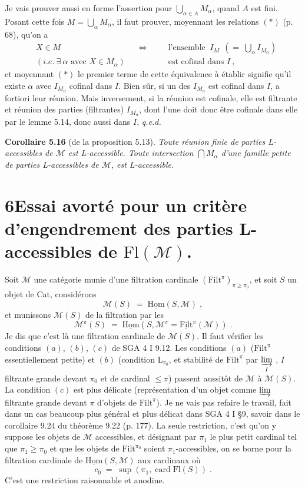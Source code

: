 \documentclass[11pt]{article}
\newcommand{\printedpage}[1]{\marginpar{\raggedright\footnotesize p.~#1}}
\newcommand{\msp}[1]{\marginpar{\raggedright\footnotesize [#1]}}
\newcommand{\Filt}{\mathrm{Filt}}
\newcommand{\Fl}{\mathrm{Fl}}
\newcommand{\card}{\operatorname{card}}
\newcommand{\uHom}{\underline{\mathrm{Hom}}}
\begin{document}
Je vais prouver aussi en forme l'assertion pour $\bigcup_{\alpha\in A} M_{\alpha}$, quand $A$ est fini. Posant cette fois $M = \bigcup_{\alpha} M_{\alpha}$, il faut prouver, moyennant les relations $(*)$ (p. 68), qu'on a
\[
\begin{aligned}
&X \in M &&\Longleftrightarrow \quad &&\text{l'ensemble } \ I_{M} \ \ (= \ \textstyle\bigcup_{\alpha} I_{M_{\alpha}})\\
&(\textit{i.e.} \ \exists \ \alpha \text{ avec } X \in M_{\alpha}) && &&\text{est cofinal dans } I \ ,
\end{aligned}
\tag*{$(**)$}
\]
et moyennant $(*)$ le premier terme de cette équivalence à établir signifie qu'il existe $\alpha$ avec $I_{M_{\alpha}}$ cofinal dans $I$. Bien sûr, si un des $I_{M_{\alpha}}$ est cofinal dans $I$, a fortiori leur réunion. Mais inversement, si la réunion est cofinale, elle est filtrante et réunion des parties (filtrantes) $I_{M_{\alpha}}$, dont l'une doit donc être cofinale dans elle par le lemme 5.14, donc aussi dans $I$, \textit{q.e.d.}

\msp{page 73}
\textbf{Corollaire 5.16} (de la proposition 5.13). \textit{Toute réunion finie de parties L-accessibles de $\mathcal{M}$ est L-accessible. Toute intersection $\bigcap M_{\alpha}$ d'une famille petite de parties L-accessibles de $\mathcal{M}$, est L-accessible.}

\printedpage{41}

\section*{6\quad Essai avorté pour un critère d'engendrement des parties L-accessibles de $\Fl(\mathcal{M})$.}

Soit $\mathcal{M}$ une catégorie munie d'une filtration cardinale $(\Filt^{\pi})_{\pi\geq\pi_{0}}$, et soit $S$ un objet de Cat, considérons
\[
\mathcal{M}(S) \;=\; \uHom(S,\mathcal{M}) \; ,
\]
et munissons $\mathcal{M}(S)$ de la filtration par les
\[
\mathcal{M}^{\pi}(S) \;=\; \uHom(S,\mathcal{M}^{\pi} = \underline{\Filt}^{\pi}(\mathcal{M})) \; .
\]
Je dis que c'est là une filtration cardinale de $\mathcal{M}(S)$. Il faut vérifier les conditions $(a)$, $(b)$, $(c)$ de SGA 4 I 9.12. Les conditions $(a)$ ($\Filt^{\pi}$ essentiellement petite) et $(b)$ (condition $\mathrm{L}_{\pi_{0}}$, et stabilité de $\Filt^{\pi}$ par $\varinjlim\limits_{I}$ , $I$ filtrante grande devant $\pi_{0}$ et de cardinal $\leq \pi$) passent aussitôt de $\mathcal{M}$ à $\mathcal{M}(S)$. La condition $(c)$ est plus délicate (représentation
\msp{page 74}
d'un objet comme $\varinjlim$ filtrante grande devant $\pi$ d'objets de $\Filt^{\pi}$). Je ne vais pas refaire le travail, fait dans un cas beaucoup plus général et plus délicat dans SGA 4 I §9, savoir dans le corollaire 9.24 du théorème 9.22 (p. 177). La seule restriction, c'est qu'on y suppose les objets de $\mathcal{M}$ accessibles, et désignant par $\pi_{1}$ le plus petit cardinal tel que $\pi_{1} \geq \pi_{0}$ et que les objets de $\Filt^{\pi_{0}}$ soient $\pi_{1}$-accessibles, on se borne pour la filtration cardinale de $\uHom(S,\mathcal{M})$ aux cardinaux  où
\[
c_{0} \;=\; \sup(\pi_{1}, \card \Fl(S)) \; .
\]
C'est une restriction raisonnable et anodine.
\end{document}
